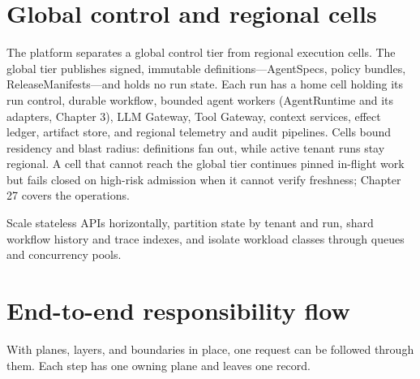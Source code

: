 \section{Global control and regional cells}

The platform separates a global control tier from regional execution cells. The global tier publishes signed, immutable definitions—AgentSpecs, policy bundles, ReleaseManifests—and holds no run state. Each run has a home cell holding its run control, durable workflow, bounded agent workers (AgentRuntime and its adapters, Chapter 3), LLM Gateway, Tool Gateway, context services, effect ledger, artifact store, and regional telemetry and audit pipelines. Cells bound residency and blast radius: definitions fan out, while active tenant runs stay regional. A cell that cannot reach the global tier continues pinned in-flight work but fails closed on high-risk admission when it cannot verify freshness; Chapter 27 covers the operations.\par

Scale stateless APIs horizontally, partition state by tenant and run, shard workflow history and trace indexes, and isolate workload classes through queues and concurrency pools.\par

\section{End-to-end responsibility flow}

With planes, layers, and boundaries in place, one request can be followed through them. Each step has one owning plane and leaves one record.\par


